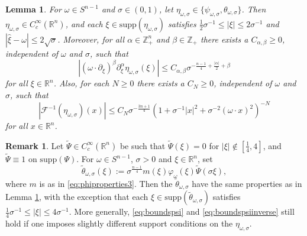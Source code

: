 \documentclass{amsart}
\newcommand {\F}{\mathcal{F}}
\newcommand {\ph}{\varphi}
\newcommand {\Rn}{\mathbb{R}^{n}}
\newcommand {\supp}{\mathrm{supp}}
\newcommand {\w}{\omega}
\newcommand {\wt}{\widetilde}
\newcommand {\Z}{\mathbb Z}
\newtheorem{lemma}[theorem]{Lemma}
\theoremstyle{definition}
\newtheorem{remark}[theorem]{Remark}
\numberwithin{equation}{section}
\begin{document}
\begin{lemma}\label{lem:packetbounds}
For $\w\in S^{n-1}$ and $\sigma\in(0,1)$, let $\eta_{\w,\sigma}\in\{\psi_{\w,\sigma},\theta_{\w,\sigma}\}$. Then $\eta_{\w,\sigma}\in C^{\infty}_{c}(\Rn)$, and each $\xi\in\supp(\eta_{\w,\sigma})$ satisfies $\frac{1}{2}\sigma^{-1}\leq |\xi|\leq 2\sigma^{-1}$ and $|\hat{\xi}-\w|\leq 2\sqrt{\sigma}$. 
Moreover, for all $\alpha\in\Z_{+}^{n}$ and $\beta\in\Z_{+}$ there exists a $C_{\alpha,\beta}\geq0$, independent of $\w$ and $\sigma$, such that
\begin{equation}\label{eq:boundspsi}
|(\w\cdot\partial_{\xi})^{\beta}\partial_{\xi}^{\alpha}\eta_{\w,\sigma}(\xi)|\leq C_{\alpha,\beta}\sigma^{-\frac{n-1}{4}+\frac{|\alpha|}{2}+\beta}
\end{equation}
for all $\xi\in\Rn$. Also, for each $N\geq0$ there exists a $C_{N}\geq0$, independent of $\w$ and $\sigma$, such that
\begin{equation}\label{eq:boundspsiinverse}
|\F^{-1}(\eta_{\w,\sigma})(x)|\leq C_{N}\sigma^{-\frac{3n+1}{4}}(1+\sigma^{-1}|x|^{2}+\sigma^{-2}(\w\cdot x)^{2})^{-N}
\end{equation}
for all $x\in\Rn$.
\end{lemma}

\begin{remark}\label{rem:thetatilde}
Let $\wt{\Psi}\in C^{\infty}_{c}(\Rn)$ be such that $\wt{\Psi}(\xi)=0$ for $|\xi|\notin [\frac{1}{4},4]$, and $\wt{\Psi}\equiv 1$ on $\supp(\Psi)$. For $\w\in S^{n-1}$, $\sigma>0$ and $\xi\in\Rn$, set
\[
\tilde{\theta}_{\w,\sigma}(\xi):=\sigma^{\frac{n-1}{4}}m(\xi)\ph_{\w}(\xi)\wt{\Psi}(\sigma\xi),
\]
where $m$ is as in \eqref{eq:phiproperties3}.
Then the $\tilde{\theta}_{\w,\sigma}$ have the same properties as in Lemma \ref{lem:packetbounds}, with the exception that each $\xi\in\supp(\tilde{\theta}_{\w,\sigma})$ satisfies $\frac{1}{4}\sigma^{-1}\leq |\xi|\leq 4\sigma^{-1}$. More generally, \eqref{eq:boundspsi} and \eqref{eq:boundspsiinverse} still hold if one imposes slightly different support conditions on the $\eta_{\w,\sigma}$.
\end{remark}

\end{document}
